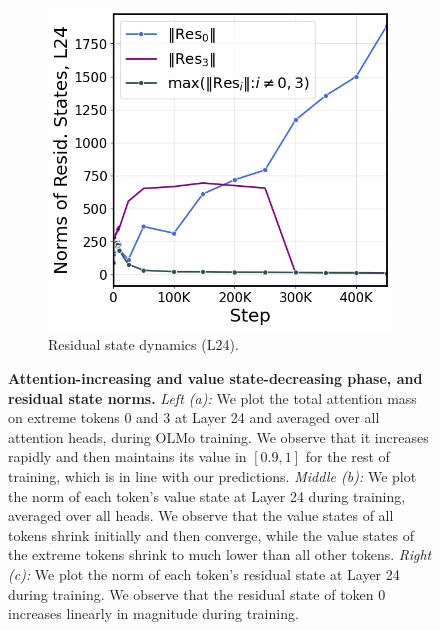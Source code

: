 \begin{figure}[thp]
\begin{subfigure}[t]{0.32\textwidth}
    \end{subfigure}
    \begin{subfigure}[t]{0.32\textwidth}
        \centering 
        \caption{\small Residual state dynamics (L24).}
        \includegraphics[width=\textwidth]{Figures/olmo/olmo_massive_norms.png}
    \end{subfigure}
    \vspace{-2em}
    \caption{\small \textbf{Attention-increasing and value state-decreasing phase, and residual state norms.} \textit{Left (a):} We plot the total attention mass on extreme tokens \(0\) and \(3\) at Layer 24 and averaged over all attention heads, during OLMo training. We observe that it increases rapidly and then maintains its value in \([0.9, 1]\) for the rest of training, which is in line with our predictions. \textit{Middle (b):} We plot the norm of each token's value state at Layer 24 during training, averaged over all heads. We observe that the value states of all tokens shrink initially and then converge, while the value states of the extreme tokens shrink to much lower than all other tokens. \textit{Right (c):}  We plot the norm of each token's residual state at Layer 24 during training. We observe that the residual state of token \(0\) increases linearly in magnitude during training.}
    \label{fig:olmo_predictions_phase0}
\end{figure}

